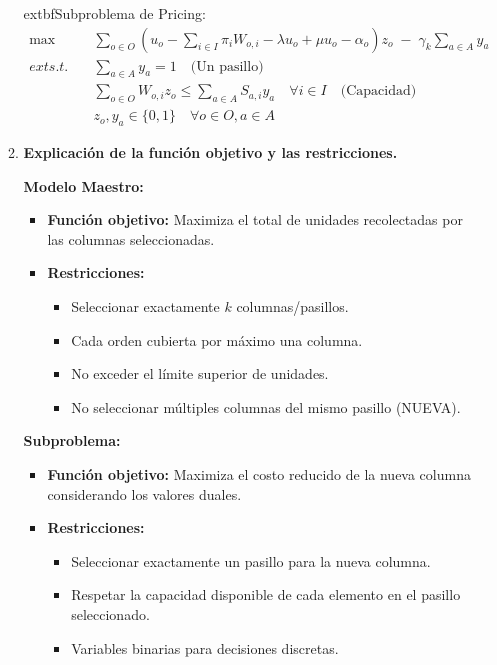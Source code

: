 \documentclass[a4paper,12pt]{article}
\begin{document}
\begin{enumerate}[label=(\alph*), leftmargin=2em]
\begin{enumerate}[label=\roman*., leftmargin=0.2em]
            	extbf{Subproblema de Pricing:}
            \[
            \begin{aligned}
            \max \quad & \sum_{o \in O} \left(u_o - \sum_{i \in I} \pi_i W_{o,i} - \lambda u_o + \mu u_o - \alpha_o\right) z_o \; - \; \gamma_k \sum_{a \in A} y_a \\
            	ext{s.t.} \quad & \sum_{a \in A} y_a = 1 \quad \text{(Un pasillo)} \\
            & \sum_{o \in O} W_{o,i} z_o \leq \sum_{a \in A} S_{a,i} y_a \quad \forall i \in I \quad \text{(Capacidad)} \\
            & z_o, y_a \in \{0,1\} \quad \forall o \in O, a \in A
            \end{aligned}
            \]

        \item \textbf{Explicación de la función objetivo y las restricciones.}

            \textbf{Modelo Maestro:}
            \begin{itemize}
                \item \textbf{Función objetivo:} Maximiza el total de unidades recolectadas por las columnas seleccionadas.
                \item \textbf{Restricciones:}
                \begin{itemize}
                    \item Seleccionar exactamente $k$ columnas/pasillos.
                    \item Cada orden cubierta por máximo una columna.
                    \item No exceder el límite superior de unidades.
                    \item No seleccionar múltiples columnas del mismo pasillo (NUEVA).
                \end{itemize}
            \end{itemize}

            \textbf{Subproblema:}
            \begin{itemize}
                \item \textbf{Función objetivo:} Maximiza el costo reducido de la nueva columna considerando los valores duales.
                \item \textbf{Restricciones:}
                \begin{itemize}
                    \item Seleccionar exactamente un pasillo para la nueva columna.
                    \item Respetar la capacidad disponible de cada elemento en el pasillo seleccionado.
                    \item Variables binarias para decisiones discretas.
                \end{itemize}
            \end{itemize}
    \end{enumerate}


\end{enumerate}
\end{document}

